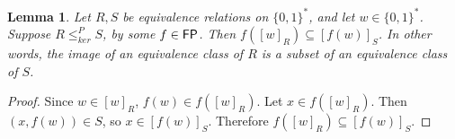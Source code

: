 \documentclass{article}
\newtheorem{theorem}{Theorem}[section]
\newtheorem{lemma}[lemma]{Lemma}
\theoremstyle{definition} \newtheorem{definition}[definition]{Definition}
\newcommand{\sigmastar}{\{0, 1\}^{*}} %
\newcommand{\kr}{\leq^{P}_{ker}} %
\begin{document}




\begin{lemma}\label{lem:image}
  Let $R,S$ be equivalence relations on $\sigmastar$, and let
  $w\in\sigmastar$. Suppose $R\kr S$, by some $f\in{\ensuremath{\mathsf{FP}}}$. Then
  $f([w]_R)\subseteq [f(w)]_S$. In other words, the image of an equivalence
  class of $R$ is a subset of an equivalence class of $S$.
\end{lemma}
\begin{proof}
  Since $w\in [w]_R$, $f(w)\in f([w]_R)$. Let $x\in f([w]_R)$. Then $(x,
  f(w))\in S$, so $x\in [f(w)]_S$. Therefore $f([w]_R)\subseteq [f(w)]_S$.
\end{proof}
\end{document}
